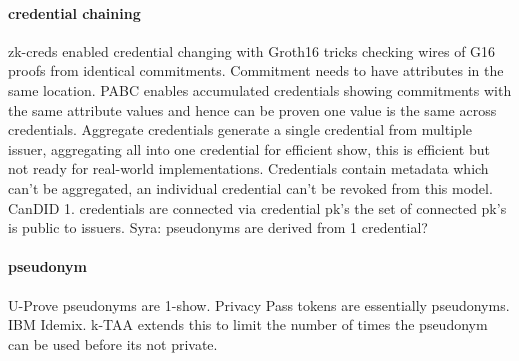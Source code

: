 \paragraph{credential chaining}
zk-creds enabled credential changing with Groth16 tricks checking wires of G16 proofs from identical commitments. Commitment needs to have attributes in the same location.
PABC enables accumulated credentials showing commitments with the same attribute values and hence can be proven one value is the same across credentials. 
Aggregate credentials generate a single credential from multiple issuer, aggregating all into one credential for efficient show, this is efficient but not ready for real-world implementations. Credentials contain metadata which can't be aggregated, an individual credential can't be revoked from this model.
CanDID 1. credentials are connected via credential pk's the set of connected pk's is public to issuers.
Syra: pseudonyms are derived from 1 credential?

\paragraph{pseudonym}
U-Prove pseudonyms are 1-show. Privacy Pass tokens are essentially pseudonyms. IBM Idemix.
k-TAA extends this to limit the number of times the pseudonym can be used before its not private.